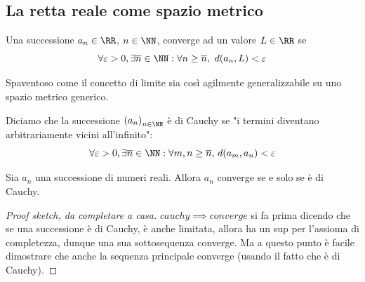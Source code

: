 \documentclass[11pt]{scrartcl}
\begin{document}
	\subsection{La retta reale come spazio metrico}
	\begin{definition}[Limite]
		Una successione $a_n\in\RR$, $n\in\NN$, converge ad un valore $L\in\RR$ se
		$$\forall \varepsilon>0,\exists \overline{n}\in\NN:\forall n\ge \overline{n},\,\,d(a_n,L)<\varepsilon$$
	\end{definition}
	Spaventoso come il concetto di limite sia così agilmente generalizzabile su uno spazio metrico generico.
	\begin{definition}
		Diciamo che la successione $\left(a_n\right)_{n\in\NN}$ è di Cauchy se "i termini diventano arbitrariamente vicini all'infinito":
		$$\forall\varepsilon>0,\exists \overline{n}\in\NN:\forall m,n\ge \overline{n},\,d(a_m,a_n)<\varepsilon$$
	\end{definition}
	\begin{theorem}\label{Cauchy}
		Sia $a_n$ una successione di numeri reali. Allora $a_n$ converge se e solo se è di Cauchy.
	\end{theorem}
	\begin{proof}[Proof sketch, da completare a casa]
		$cauchy\implies converge$ si fa prima dicendo che se una successione è di Cauchy, è anche limitata, allora ha un sup per l'assioma di completezza, dunque una sua sottosequenza converge. Ma a questo punto è facile dimostrare che anche la sequenza principale converge (usando il fatto che è di Cauchy).
	\end{proof}
\end{document}

